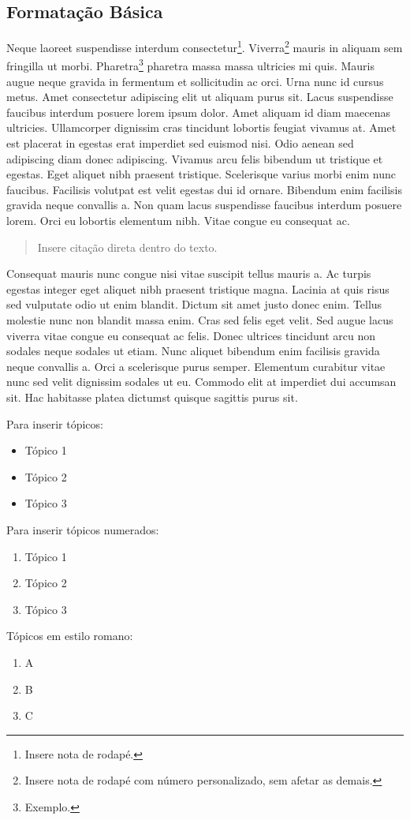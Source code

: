 \documentclass[a4paper]{article} %
\begin{document}
\subsection{Formatação Básica} \label{SS11}
Neque laoreet suspendisse interdum consectetur\footnote{Insere nota de rodapé.}. Viverra\footnote[99]{Insere nota de rodapé com número personalizado, sem afetar as demais.} mauris in aliquam sem fringilla ut morbi. Pharetra\footnote{Exemplo.} pharetra massa massa ultricies mi quis. Mauris augue neque gravida in fermentum et sollicitudin ac orci. Urna nunc id cursus metus. Amet consectetur adipiscing elit ut aliquam purus sit. Lacus suspendisse faucibus interdum posuere lorem ipsum dolor. Amet aliquam id diam maecenas ultricies. Ullamcorper dignissim cras tincidunt lobortis feugiat vivamus at. Amet est placerat in egestas erat imperdiet sed euismod nisi. Odio aenean sed adipiscing diam donec adipiscing. Vivamus arcu felis bibendum ut tristique et egestas. Eget aliquet nibh praesent tristique. Scelerisque varius morbi enim nunc faucibus. Facilisis volutpat est velit egestas dui id ornare. Bibendum enim facilisis gravida neque convallis a. Non quam lacus suspendisse faucibus interdum posuere lorem. Orci eu lobortis elementum nibh. Vitae congue eu consequat ac. \par %
\begin{quote}
Insere citação direta dentro do texto.
\end{quote}
Consequat mauris nunc congue nisi vitae suscipit tellus mauris a. Ac turpis egestas integer eget aliquet nibh praesent tristique magna. Lacinia at quis risus sed vulputate odio ut enim blandit. Dictum sit amet justo donec enim. Tellus molestie nunc non blandit massa enim. Cras sed felis eget velit. Sed augue lacus viverra vitae congue eu consequat ac felis. Donec ultrices tincidunt arcu non sodales neque sodales ut etiam. Nunc aliquet bibendum enim facilisis gravida neque convallis a. Orci a scelerisque purus semper. Elementum curabitur vitae nunc sed velit dignissim sodales ut eu. Commodo elit at imperdiet dui accumsan sit. Hac habitasse platea dictumst quisque sagittis purus sit. \par 
Para inserir tópicos:
\begin{itemize}
\item Tópico 1 
\item Tópico 2
\item Tópico 3
\end{itemize}
Para inserir tópicos numerados:
\begin{enumerate}
\item Tópico 1
\item Tópico 2
\item Tópico 3
\end{enumerate}
Tópicos em estilo romano:
\begin{enumerate}[label=(\Roman*)]
\item A
\item B
\item C
\end{enumerate}
\end{document}
